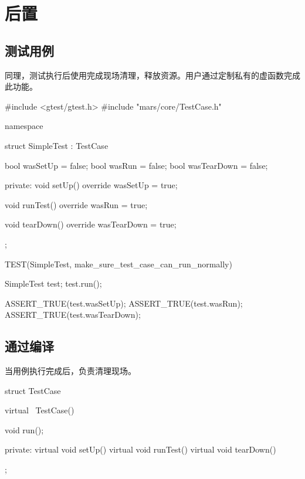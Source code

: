\section{后置}

\begin{content}

\subsection{测试用例}

同理，测试执行后使用完成现场清理，释放资源。用户通过定制私有的虚函数完成此功能。

\begin{leftbar}
 \begin{c++}[caption={\ttfamily{test/mars/core/TestCaseSpec.cc}}]
#include <gtest/gtest.h>
#include "mars/core/TestCase.h"

namespace {
  struct SimpleTest : TestCase {
    bool wasSetUp = false;
    bool wasRun = false;
    bool wasTearDown = false;

  private:
    void setUp() override {
      wasSetUp = true;
    }

    void runTest() override {
      wasRun = true;
    }

    void tearDown() override {
      wasTearDown = true;
    }
  };
}

TEST(SimpleTest, make_sure_test_case_can_run_normally) {
  SimpleTest test;
  test.run();

  ASSERT_TRUE(test.wasSetUp);
  ASSERT_TRUE(test.wasRun);
  ASSERT_TRUE(test.wasTearDown);  
}
 \end{c++}
\end{leftbar}

\subsection{通过编译}

当用例执行完成后，负责清理现场。

\begin{leftbar}
 \begin{c++}[caption={\ttfamily{include/mars/core/TestCase.h}}]
struct TestCase {
  virtual ~TestCase() {}

  void run();

private:
  virtual void setUp() {}
  virtual void runTest() {}
  virtual void tearDown() {}
};
  \end{c++}
\end{leftbar}


\end{content}
